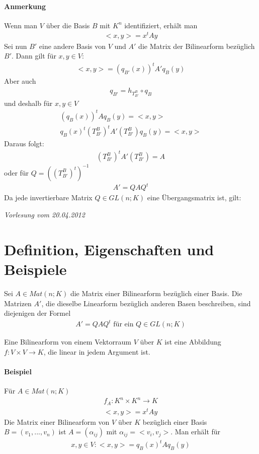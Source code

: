 \paragraph{Anmerkung}
Wenn man $V$ über die Basis $B$ mit $K^n$ identifiziert, erhält man
\begin{align}
<x, y> = x^t A y
\end{align}
Sei nun $B'$ eine andere Basis von $V$ und $A'$ die Matrix der Bilinearform bezüglich $B'$. Dann gilt für $x, y \in V$:
\begin{align}
<x, y> = (q_{B'}(x))^t A' q_B(y)
\end{align}
Aber auch
\begin{align}
q_{B'} = h_{T_{B'}^{B}} \circ q_B
\end{align}
und deshalb für $x, y \in V$
\begin{align}
(q_B(x))^t A q_B(y) = <x, y> \\
q_B(x)^t (T_{B'}^{B})^t A' (T_{B'}^{B}) q_B(y) = <x, y>
\end{align}
Daraus folgt:
\begin{align}
(T_{B'}^{B})^t A' (T_{B'}^{B}) = A
\end{align}
oder für $Q = ((T_{B'}^{B})^t)^{-1}$
\begin{align}
A' = QAQ^t
\end{align}
Da jede invertierbare Matrix $Q \in GL(n; K)$ eine Übergangsmatrix ist, gilt:


\newpage
\noindent \textit{Vorlesung vom 20.04.2012} \\
\section{Definition, Eigenschaften und Beispiele} %

\begin{satz} %
\label{satz511}
Sei $A \in Mat(n; K)$ die Matrix einer Bilinearform bezüglich einer Basis. Die Matrizen $A'$, die dieselbe Linearform bezüglich anderen Basen beschreiben, sind diejenigen der Formel
\begin{align}
A' = Q A Q^t \text{ für ein } Q \in GL(n;K)
\end{align}
\end{satz}
Eine Bilinearform von einem Vektorraum $V$ über $K$ ist eine Abbildung $f: V \times V \rightarrow K$, die linear in jedem Argument ist.

\paragraph{Beispiel}
Für $A \in Mat(n; K)$
\begin{align}
f_A: K^n \times K^n \rightarrow K \\
<x, y> = x^t A y
\end{align}
Die Matrix einer Bilinearform von $V$ über $K$ bezüglich einer Basis $B = (v_1, ..., v_n)$ ist $A = (\alpha_{ij})$ mit $\alpha_{ij} = <v_i, v_j>$. Man erhält für 
\begin{align}
x, y \in V: <x, y> = q_B(x)^t A q_B(y)
\end{align}


